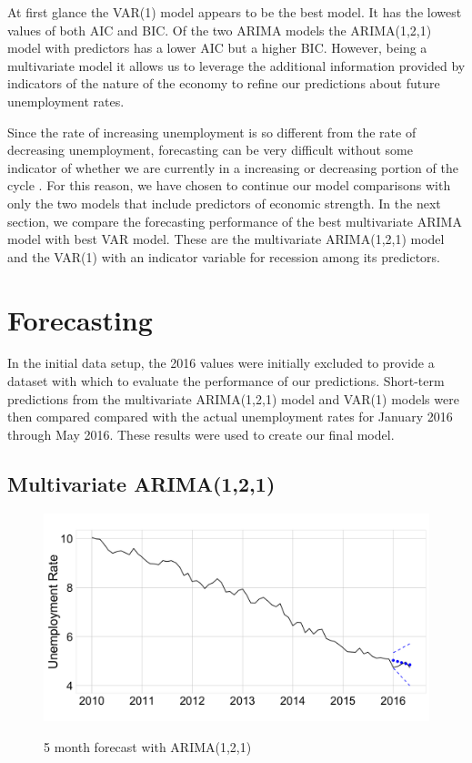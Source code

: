 \documentclass[twoside,twocolumn]{article}
\begin{document}
At first glance the VAR(1) model appears to be the best model.  It has the lowest values of both AIC and BIC.  Of the two ARIMA models the ARIMA(1,2,1) model with predictors has a lower AIC but a higher BIC. However, being a multivariate model it allows us to leverage the additional information provided by indicators of the nature of the economy to refine our predictions about future unemployment rates.

Since the rate of increasing unemployment is so different from the rate of decreasing unemployment, forecasting can be very difficult without some indicator of whether we are currently in a increasing or decreasing portion of the cycle \citep{Montgomery1998}. For this reason, we have chosen to continue our model comparisons with only the two models that include predictors of economic strength. In the next section, we compare the forecasting performance of the best multivariate ARIMA model with best VAR model. These are the multivariate ARIMA(1,2,1) model and the VAR(1) with an indicator variable for recession among its predictors.


\section{Forecasting}

In the initial data setup, the 2016 values were initially excluded to provide a dataset with which to evaluate the performance of our predictions. Short-term predictions from the multivariate ARIMA(1,2,1) model and VAR(1) models were then compared compared with the actual unemployment rates for January 2016 through May 2016. These results were used to create our final model.

\subsection{Multivariate ARIMA(1,2,1)}

   \begin{figure}[htb]
    	\centering
     	\caption{5 month forecast with ARIMA(1,2,1)}
     	\includegraphics[width=\linewidth]{images/ARIMApred}
     	\label{fig:arimapred}
 \end{figure}
\end{document}

